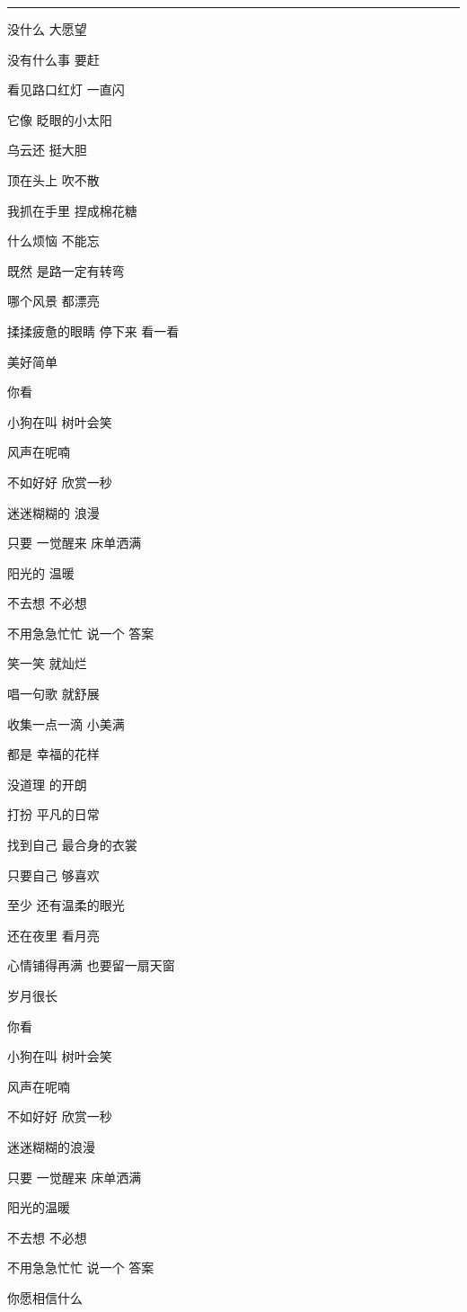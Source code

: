 \documentclass[]{ctexbook}
\begin{document}
\begin{center}\rule{0.5\linewidth}{0.5pt}\end{center}

没什么 大愿望

没有什么事 要赶

看见路口红灯 一直闪

它像 眨眼的小太阳

乌云还 挺大胆

顶在头上 吹不散

我抓在手里 捏成棉花糖

什么烦恼 不能忘

既然 是路一定有转弯

哪个风景 都漂亮

揉揉疲惫的眼睛 停下来 看一看

美好简单

你看

小狗在叫 树叶会笑

风声在呢喃

不如好好 欣赏一秒

迷迷糊糊的 浪漫

只要 一觉醒来 床单洒满

阳光的 温暖

不去想 不必想

不用急急忙忙 说一个 答案

笑一笑 就灿烂

唱一句歌 就舒展

收集一点一滴 小美满

都是 幸福的花样

没道理 的开朗

打扮 平凡的日常

找到自己 最合身的衣裳

只要自己 够喜欢

至少 还有温柔的眼光

还在夜里 看月亮

心情铺得再满 也要留一扇天窗

岁月很长

你看

小狗在叫 树叶会笑

风声在呢喃

不如好好 欣赏一秒

迷迷糊糊的浪漫

只要 一觉醒来 床单洒满

阳光的温暖

不去想 不必想

不用急急忙忙 说一个 答案

你愿相信什么
\end{document}

